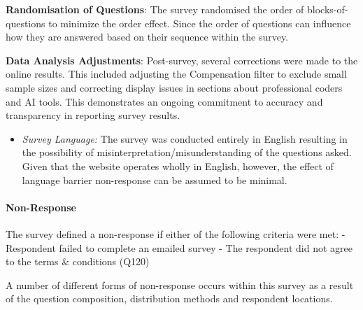 \documentclass[
  12pt,
]{article}
\providecommand{\tightlist}{%
  \setlength{\itemsep}{0pt}\setlength{\parskip}{0pt}}
\begin{document}
\textbf{Randomisation of Questions}: The survey randomised the order of
blocks-of-questions to minimize the order effect. Since the order of
questions can influence how they are answered based on their sequence
within the survey. \newline \newline

\textbf{Data Analysis Adjustments}: Post-survey, several corrections
were made to the online results. This included adjusting the
Compensation filter to exclude small sample sizes and correcting display
issues in sections about professional coders and AI tools. This
demonstrates an ongoing commitment to accuracy and transparency in
reporting survey results. \newline \newline

\begin{itemize}
\tightlist
\item
  \emph{Survey Language:} The survey was conducted entirely in English
  resulting in the possibility of misinterpretation/misunderstanding of
  the questions asked. Given that the website operates wholly in
  English, however, the effect of language barrier non-response can be
  assumed to be minimal. \newline \newline \newline
\end{itemize}

\hypertarget{non-response}{%
\paragraph{Non-Response}\label{non-response}}

\newline

The survey defined a non-response if either of the following criteria
were met: \newline - Respondent failed to complete an emailed survey
\newline - The respondent did not agree to the terms \& conditions
(Q120) \newline \newline

A number of different forms of non-response occurs within this survey as
a result of the question composition, distribution methods and
respondent locations. \newline
\end{document}
